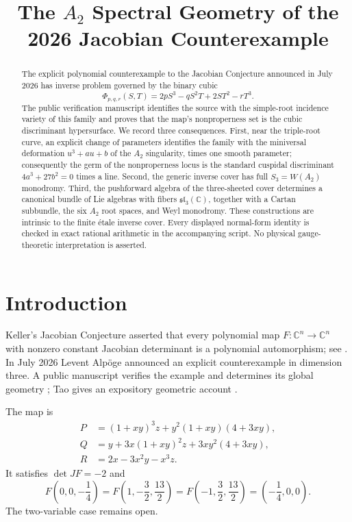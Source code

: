 \documentclass[11pt,reqno]{amsart}
\title[The $A_2$ spectral geometry of the Jacobian counterexample]
{The $A_2$ Spectral Geometry of the 2026 Jacobian Counterexample}
\author{\AuthorName}
\date{\PreprintDate}
\numberwithin{equation}{section}
\theoremstyle{remark}
\newcommand{\C}{\mathbb C}
\begin{document}
\begin{abstract}
The explicit polynomial counterexample to the Jacobian Conjecture announced in July 2026 has inverse problem governed by the binary cubic
\[
\Phi_{p,q,r}(S,T)=2pS^3-qS^2T+2ST^2-rT^3.
\]
The public verification manuscript identifies the source with the simple-root incidence variety of this family and proves that the map's nonproperness set is the cubic discriminant hypersurface. We record three consequences. First, near the triple-root curve, an explicit change of parameters identifies the family with the miniversal deformation $u^3+au+b$ of the $A_2$ singularity, times one smooth parameter; consequently the germ of the nonproperness locus is the standard cuspidal discriminant $4a^3+27b^2=0$ times a line. Second, the generic inverse cover has full $S_3=W(A_2)$ monodromy. Third, the pushforward algebra of the three-sheeted cover determines a canonical bundle of Lie algebras with fibers $\mathfrak{sl}_3(\C)$, together with a Cartan subbundle, the six $A_2$ root spaces, and Weyl monodromy. These constructions are intrinsic to the finite étale inverse cover. Every displayed normal-form identity is checked in exact rational arithmetic in the accompanying script. No physical gauge-theoretic interpretation is asserted.
\end{abstract}

\maketitle

\section{Introduction}

Keller's Jacobian Conjecture asserted that every polynomial map $F:\C^n\to\C^n$ with nonzero constant Jacobian determinant is a polynomial automorphism; see \cite{vanDenEssen2000}. In July 2026 Levent Alpöge announced an explicit counterexample in dimension three. A public manuscript verifies the example and determines its global geometry \cite{Counterexample2026}; Tao gives an expository geometric account \cite{Tao2026}.

The map is
\begin{equation}\label{eq:F}
\begin{aligned}
P&=(1+xy)^3z+y^2(1+xy)(4+3xy),\\
Q&=y+3x(1+xy)^2z+3xy^2(4+3xy),\\
R&=2x-3x^2y-x^3z.
\end{aligned}
\end{equation}
It satisfies $\det JF=-2$ and
\[
F\left(0,0,-\frac14\right)
=F\left(1,-\frac32,\frac{13}{2}\right)
=F\left(-1,\frac32,\frac{13}{2}\right)
=\left(-\frac14,0,0\right).
\]
The two-variable case remains open.
\end{document}
